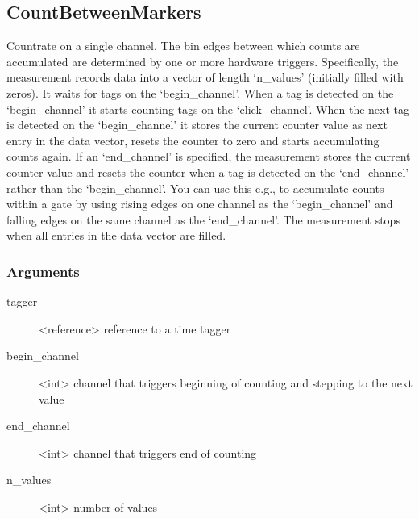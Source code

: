 \documentclass[letterpaper,10pt,english]{sphinxmanual}
\begin{document}
\subsection{CountBetweenMarkers}
\label{sections/api:countbetweenmarkers}
Countrate on a single channel. The bin edges between which counts are accumulated
are determined by one or more hardware triggers. Specifically, the measurement records data into a vector of length `n\_values' (initially filled with zeros).
It waits for tags on the `begin\_channel'. When a tag is detected on the `begin\_channel' it starts counting tags
on the `click\_channel'. When the next tag is detected on the `begin\_channel' it stores the current counter value as next entry in the data vector,
resets the counter to zero and starts accumulating counts again. If an `end\_channel' is specified, the measurement stores the current counter value and resets the counter
when a tag is detected on the `end\_channel' rather than the `begin\_channel'. You can use this e.g., to accumulate counts within a gate by using
rising edges on one channel as the `begin\_channel' and falling edges on the same channel as the `end\_channel'. The measurement stops when all
entries in the data vector are filled.


\subsubsection{Arguments}
\label{sections/api:id2}\begin{description}
\item[{tagger}] \leavevmode
\textless{}reference\textgreater{} reference to a time tagger

\item[{begin\_channel}] \leavevmode
\textless{}int\textgreater{} channel that triggers beginning of counting and stepping to the next value

\item[{end\_channel}] \leavevmode
\textless{}int\textgreater{} channel that triggers end of counting

\item[{n\_values}] \leavevmode
\textless{}int\textgreater{} number of values

\end{description}
\end{document}
